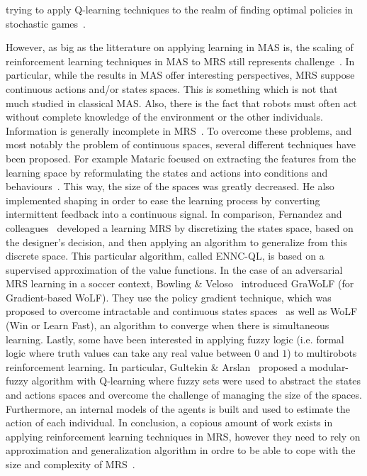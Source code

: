 trying to apply Q-learning techniques to the realm of finding optimal policies in stochastic games~\parencite{Littman1994, Claus1998, Bowling2003, Greenwald2005, Kapetanakis2005}.

    However, as big as the litterature on applying learning in MAS is, the scaling of reinforcement learning techniques in MAS to MRS still represents challenge~\parencite{Yang2005}. In particular, while the results in MAS offer interesting perspectives, MRS suppose continuous actions and/or states spaces. This is something which is not that much studied in classical MAS. Also, there is the fact that robots must often act without complete knowledge of the environment or the other individuals. Information is generally incomplete in MRS~\parencite{Yang2005, Fernandez2005}. To overcome these problems, and most notably the problem of continuous spaces, several different techniques have been proposed. For example Mataric focused on extracting the features from the learning space by reformulating the states and actions into conditions and behaviours~\parencite{Mataric1997}. This way, the size of the spaces was greatly decreased. He also implemented shaping in order to ease the learning process by converting intermittent feedback into a continuous signal. In comparison, Fernandez and colleagues~\parencite{Fernandez2005} developed a learning MRS by discretizing the states space, based on the designer's decision, and then applying an algorithm to generalize from this discrete space. This particular algorithm, called ENNC-QL, is based on a supervised approximation of the value functions. In the case of an adversarial MRS learning in a soccer context, Bowling \& Veloso~\parencite{Bowling2003} introduced GraWoLF (for Gradient-based WoLF). They use the policy gradient technique, which was proposed to overcome intractable and continuous states spaces~\parencite{Sutton2000} as well as WoLF (Win or Learn Fast), an algorithm to converge when there is simultaneous learning. Lastly, some have been interested in applying fuzzy logic (i.e. formal logic where truth values can take any real value between $0$ and $1$) to multirobots reinforcement learning. In particular, Gultekin \& Arslan~\parencite{Gultekin2002} proposed a modular-fuzzy algorithm with Q-learning where fuzzy sets were used to abstract the states and actions spaces and overcome the challenge of managing the size of the spaces. Furthermore, an internal models of the agents is built and used to estimate the action of each individual. In conclusion, a copious amount of work exists in applying reinforcement learning techniques in MRS, however they need to rely on approximation and generalization algorithm in ordre to be able to cope with the size and complexity of MRS~\parencite{Yang2005, Parker2008}.

